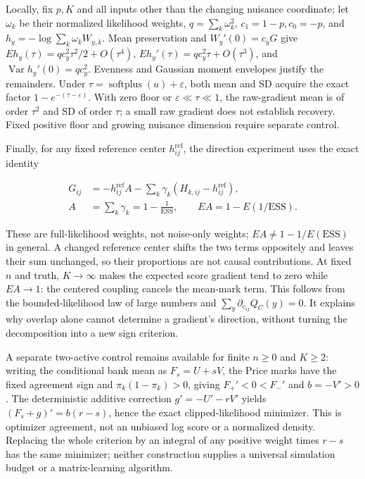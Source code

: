 \documentclass{article}
\begin{document}
Locally, fix \(p,K\) and all inputs other than the changing nuisance
coordinate; let \(\omega_k\) be their normalized likelihood weights,
\(q=\sum_k\omega_k^2\), \(c_1=1-p,c_0=-p\), and
\(h_y=-\log\sum_k\omega_kW_{y,k}\). Mean preservation and
\(W_y'(0)=c_yG\) give \(Eh_y(\tau)=q c_y^2\tau^2/2+O(\tau^4)\),
\(Eh_y'(\tau)=q c_y^2\tau+O(\tau^3)\), and
\(\operatorname{Var}h_y'(0)=q c_y^2\). Evenness and Gaussian moment
envelopes justify the remainders. Under
\(\tau=\operatorname{softplus}(u)+\varepsilon\), both mean and SD
acquire the exact factor \(1-e^{-(\tau-\varepsilon)}\). With zero floor
or \(\varepsilon\ll\tau\ll1\), the raw-gradient mean is of order
\(\tau^2\) and SD of order \(\tau\); a small raw gradient does not
establish recovery. Fixed positive floor and growing nuisance dimension
require separate control.

Finally, for any fixed reference center \(h_{ij}^{\mathrm{ref}}\), the
direction experiment uses the exact identity

\[
\begin{aligned}
G_{ij}&=-h_{ij}^{\mathrm{ref}}A-\sum_k\gamma_k(H_{k,ij}-h_{ij}^{\mathrm{ref}}),\\
A&=\sum_k\gamma_k=1-\frac1{\mathrm{ESS}},\qquad EA=1-E(1/\mathrm{ESS}).
\end{aligned}
\tag{A.31}
\]

These are full-likelihood weights, not noise-only weights;
\(EA\ne1-1/E(\mathrm{ESS})\) in general. A changed reference center
shifts the two terms oppositely and leaves their sum unchanged, so their
proportions are not causal contributions. At fixed \(n\) and truth,
\(K\to\infty\) makes the expected score gradient tend to zero while
\(EA\to1\): the centered coupling cancels the mean-mark term. This
follows from the bounded-likelihood law of large numbers and
\(\sum_y\partial_{c_{ij}}Q_C(y)=0\). It explains why overlap alone
cannot determine a gradient's direction, without turning the
decomposition into a new sign criterion.

A separate two-active control remains available for finite \(n\ge0\) and
\(K\ge2\): writing the conditional bank mean as \(F_s=U+sV\), the Price
marks have the fixed agreement sign and \(\pi_k(1-\pi_k)>0\), giving
\(F_+'<0<F_-'\) and \(b=-V'>0\). The deterministic additive correction
\(g'=-U'-rV'\) yields \((F_s+g)'=b(r-s)\), hence the exact
clipped-likelihood minimizer. This is optimizer agreement, not an
unbiased log score or a normalized density. Replacing the whole
criterion by an integral of any positive weight times \(r-s\) has the
same minimizer; neither construction supplies a universal simulation
budget or a matrix-learning algorithm.
\end{document}
